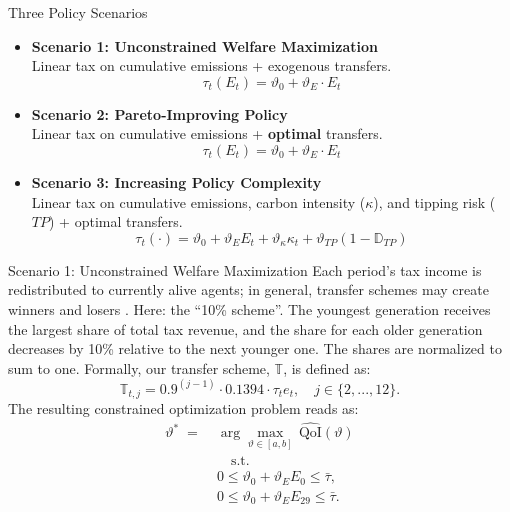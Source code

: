 \documentclass[aspectratio=169,11pt]{beamer}
\newcommand{\keyc}[1]{\textcolor{uzhblue}{#1}}
\begin{document}
\begin{frame}{Three Policy Scenarios}
\small
    \begin{itemize}
        \setlength\itemsep{1em}
        \item \textbf{Scenario 1: Unconstrained Welfare Maximization} \\
        \small{Linear tax on cumulative emissions + exogenous transfers.}
        \begin{equation*}
            \tau_t(E_t) = \vartheta_0 + \vartheta_E \cdot E_t
        \end{equation*}
        \item \textbf{Scenario 2: Pareto-Improving Policy} \\
        \small{Linear tax on cumulative emissions + \textbf{optimal} transfers.}
        \begin{equation*}
             \tau_t(E_t) = \vartheta_0 + \vartheta_E \cdot E_t
        \end{equation*}
        \item \textbf{Scenario 3: Increasing Policy Complexity} \\
        \small{Linear tax on cumulative emissions, carbon intensity ($\kappa$), and tipping risk ($TP$) + optimal transfers.}
        \begin{equation*}
            \tau_t(\cdot) = \vartheta_0 + \vartheta_E E_t + \vartheta_\kappa \kappa_t + \vartheta_{TP} (1-\mathbb{D}_{TP})
        \end{equation*}
    \end{itemize}
\end{frame}

\begin{frame}{Scenario 1: Unconstrained Welfare Maximization}
\small
Each period's tax income is redistributed to currently alive agents; in general, \keyc{transfer schemes may create winners and losers} \citep{kotlikoff2021making}. Here: the ``10\% scheme''. The youngest generation receives the largest share of total tax revenue, and the share for each older generation decreases by 10\% relative to the next younger one. The shares are normalized to sum to one. Formally, our transfer scheme, $\mathbb{T}$, is defined as:
\begin{equation}
    \mathbb{T}_{t,j} = 0.9^{(j-1)} \cdot 0.1394 \cdot \tau_t e_t, \quad j \in \{2,...,12 \}.
\end{equation}
The resulting constrained optimization problem reads as:
\begin{equation}
\label{eq:optim_cum_emm_maxwelf}
\begin{aligned}
  \vartheta^{\ast}
  \;=\;
  & \arg\max_{\vartheta\in[a,b]}\,
  \widehat{\mathrm{QoI}}(\vartheta) \\
& \quad \text{s.t.} \\
& 0 \leq \vartheta_0 + \vartheta_E  E_0 \leq \bar{\tau}, \\
& 0 \leq \vartheta_0 + \vartheta_E  E_{29} \leq \bar{\tau}.
\end{aligned}
\end{equation}
\end{frame}
\end{document}
